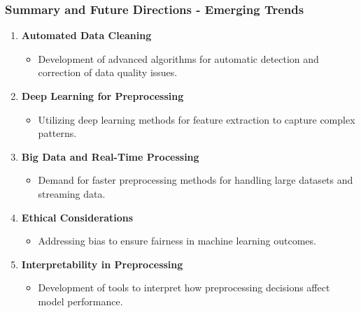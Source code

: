 \documentclass[aspectratio=169]{beamer}
\begin{document}
\begin{frame}[fragile]
    \frametitle{Summary and Future Directions - Emerging Trends}
    \begin{enumerate}
        \item \textbf{Automated Data Cleaning}
        \begin{itemize}
            \item Development of advanced algorithms for automatic detection and correction of data quality issues.
        \end{itemize}

        \item \textbf{Deep Learning for Preprocessing}
        \begin{itemize}
            \item Utilizing deep learning methods for feature extraction to capture complex patterns.
        \end{itemize}

        \item \textbf{Big Data and Real-Time Processing}
        \begin{itemize}
            \item Demand for faster preprocessing methods for handling large datasets and streaming data.
        \end{itemize}

        \item \textbf{Ethical Considerations}
        \begin{itemize}
            \item Addressing bias to ensure fairness in machine learning outcomes.
        \end{itemize}

        \item \textbf{Interpretability in Preprocessing}
        \begin{itemize}
            \item Development of tools to interpret how preprocessing decisions affect model performance.
        \end{itemize}
    \end{enumerate}
\end{frame}
\end{document}
